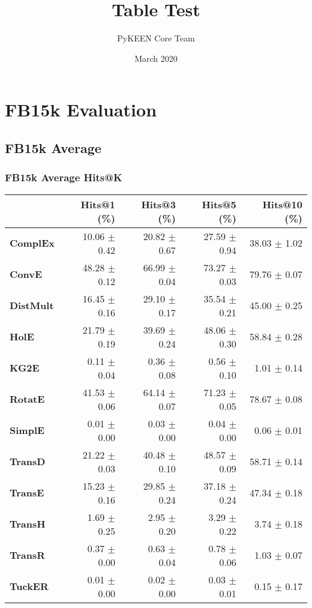 \documentclass{article}
\title{Table Test}
\author{PyKEEN Core Team}
\date{March 2020}
\begin{document}
\section{FB15k Evaluation}
\subsection{FB15k Average}
\subsubsection{FB15k Average Hits@K}
    \begin{center}
    \begin{tabular}{lrrrr}
\toprule
{} &   Hits@1 (\%) &   Hits@3 (\%) &   Hits@5 (\%) &  Hits@10 (\%) \\
\midrule
\textbf{ComplEx } &  10.06 $\pm$ 0.42 &  20.82 $\pm$ 0.67 &  27.59 $\pm$ 0.94 &  38.03 $\pm$ 1.02 \\
\textbf{ConvE   } &  48.28 $\pm$ 0.12 &  66.99 $\pm$ 0.04 &  73.27 $\pm$ 0.03 &  79.76 $\pm$ 0.07 \\
\textbf{DistMult} &  16.45 $\pm$ 0.16 &  29.10 $\pm$ 0.17 &  35.54 $\pm$ 0.21 &  45.00 $\pm$ 0.25 \\
\textbf{HolE    } &  21.79 $\pm$ 0.19 &  39.69 $\pm$ 0.24 &  48.06 $\pm$ 0.30 &  58.84 $\pm$ 0.28 \\
\textbf{KG2E    } &  $\phantom{5}$0.11 $\pm$ 0.04 &  $\phantom{5}$0.36 $\pm$ 0.08 &  $\phantom{5}$0.56 $\pm$ 0.10 &  $\phantom{5}$1.01 $\pm$ 0.14 \\
\textbf{RotatE  } &  41.53 $\pm$ 0.06 &  64.14 $\pm$ 0.07 &  71.23 $\pm$ 0.05 &  78.67 $\pm$ 0.08 \\
\textbf{SimplE  } &  $\phantom{5}$0.01 $\pm$ 0.00 &  $\phantom{5}$0.03 $\pm$ 0.00 &  $\phantom{5}$0.04 $\pm$ 0.00 &  $\phantom{5}$0.06 $\pm$ 0.01 \\
\textbf{TransD  } &  21.22 $\pm$ 0.03 &  40.48 $\pm$ 0.10 &  48.57 $\pm$ 0.09 &  58.71 $\pm$ 0.14 \\
\textbf{TransE  } &  15.23 $\pm$ 0.16 &  29.85 $\pm$ 0.24 &  37.18 $\pm$ 0.24 &  47.34 $\pm$ 0.18 \\
\textbf{TransH  } &  $\phantom{5}$1.69 $\pm$ 0.25 &  $\phantom{5}$2.95 $\pm$ 0.20 &  $\phantom{5}$3.29 $\pm$ 0.22 &  $\phantom{5}$3.74 $\pm$ 0.18 \\
\textbf{TransR  } &  $\phantom{5}$0.37 $\pm$ 0.00 &  $\phantom{5}$0.63 $\pm$ 0.04 &  $\phantom{5}$0.78 $\pm$ 0.06 &  $\phantom{5}$1.03 $\pm$ 0.07 \\
\textbf{TuckER  } &  $\phantom{5}$0.01 $\pm$ 0.00 &  $\phantom{5}$0.02 $\pm$ 0.00 &  $\phantom{5}$0.03 $\pm$ 0.01 &  $\phantom{5}$0.15 $\pm$ 0.17 \\
\bottomrule
\end{tabular}

    \end{center}
\end{document}
